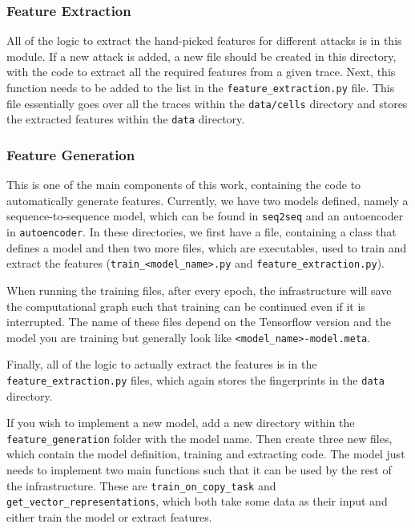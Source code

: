 \subsubsection{Feature Extraction}

All of the logic to extract the hand-picked features for different attacks is in this module.
If a new attack is added, a new file should be created in this directory, with the code to extract all the required features from a given trace.
Next, this function needs to be added to the list in the \texttt{feature\_extraction.py} file.
This file essentially goes over all the traces within the \texttt{data/cells} directory and stores the extracted features within the \texttt{data} directory.

\subsubsection{Feature Generation}

This is one of the main components of this work, containing the code to automatically generate features.
Currently, we have two models defined, namely a sequence-to-sequence model, which can be found in \texttt{seq2seq} and an autoencoder in \texttt{autoencoder}.
In these directories, we first have a file, containing a class that defines a model and then two more files, which are executables, used to train and extract the features (\texttt{train\_<model\_name>.py} and \texttt{feature\_extraction.py}).

When running the training files, after every epoch, the infrastructure will save the computational graph such that training can be continued even if it is interrupted.
The name of these files depend on the Tensorflow version and the model you are training but generally look like \texttt{<model\_name>-model.meta}.

Finally, all of the logic to actually extract the features is in the \texttt{feature\_extraction.py} files, which again stores the fingerprints in the \texttt{data} directory.

If you wish to implement a new model, add a new directory within the \texttt{feature_generation} folder with the model name.
Then create three new files, which contain the model definition, training and extracting code.
The model  just needs to implement two main functions such that it can be used by the rest of the infrastructure.
These are \texttt{train\_on\_copy\_task} and \texttt{get\_vector\_representations}, which both take some data as their input and either train the model or extract features.

